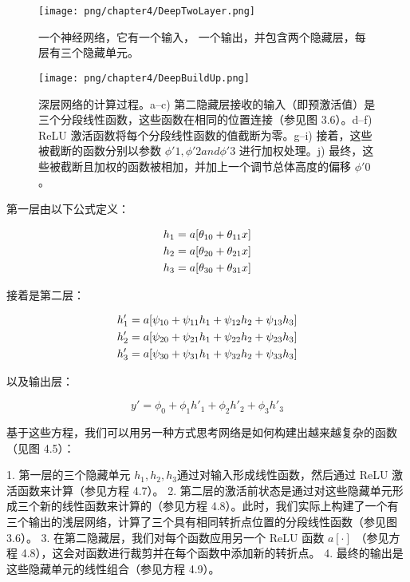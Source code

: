 \begin{figure}[ht!]
	\centering
	\texttt{[image: png/chapter4/DeepTwoLayer.png]}
	\caption{ 一个神经网络，它有一个输入， 一个输出，并包含两个隐藏层，每层有三个隐藏单元。}
\end{figure}


\begin{figure}[ht!]
	\centering
	\texttt{[image: png/chapter4/DeepBuildUp.png]}
	\caption{深层网络的计算过程。a–c) 第二隐藏层接收的输入（即预激活值）是三个分段线性函数，这些函数在相同的位置连接（参见图 3.6）。d–f) ReLU 激活函数将每个分段线性函数的值截断为零。g–i) 接着，这些被截断的函数分别以参数 \(\phi \prime 1, \phi \prime 2 and \phi \prime 3\) 进行加权处理。j) 最终，这些被截断且加权的函数被相加，并加上一个调节总体高度的偏移 \(\phi \prime 0\)。}
\end{figure}


第一层由以下公式定义：


\begin{align}
	h_1 = a[\theta_{10} + \theta_{11}x] \notag \\
	h_2 = a[\theta_{20} + \theta_{21}x] \notag \\
	h_3 = a[\theta_{30} + \theta_{31}x] 
\end{align} 


接着是第二层：


\begin{align}
	h'_1 = a[\psi_{10} + \psi_{11}h_1 + \psi_{12}h_2 + \psi_{13}h_3] \notag \\
	h'_2 = a[\psi_{20} + \psi_{21}h_1 + \psi_{22}h_2 + \psi_{23}h_3] \notag \\
	h'_3 = a[\psi_{30} + \psi_{31}h_1 + \psi_{32}h_2 + \psi_{33}h_3] 
\end{align} 


以及输出层：

\begin{equation}
y' = \phi_0 + \phi_1h'_1 + \phi_2h'_2 + \phi_3h'_3 
\end{equation}

基于这些方程，我们可以用另一种方式思考网络是如何构建出越来越复杂的函数（见图 4.5）：

1. 第一层的三个隐藏单元 \(h_1,h_2,h_3\)通过对输入形成线性函数，然后通过 ReLU 激活函数来计算（参见方程 4.7）。
2. 第二层的激活前状态是通过对这些隐藏单元形成三个新的线性函数来计算的（参见方程 4.8）。此时，我们实际上构建了一个有三个输出的浅层网络，计算了三个具有相同转折点位置的分段线性函数（参见图 3.6）。 
3. 在第二隐藏层，我们对每个函数应用另一个 ReLU 函数 \(a[\cdot]\) （参见方程 4.8），这会对函数进行裁剪并在每个函数中添加新的转折点。
4. 最终的输出是这些隐藏单元的线性组合（参见方程 4.9）。


